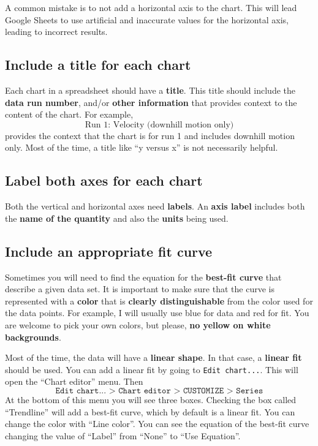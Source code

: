 A common mistake is to not add a horizontal axis to the chart. This will lead Google Sheets to use artificial and inaccurate values for the horizontal axis, leading to incorrect results.
%
\subsection{Include a title for each chart}
%
Each chart in a spreadsheet should have a \textbf{title}. This title should include the \textbf{data run number}, and/or \textbf{other information} that provides context to the content of the chart. For example,
\begin{equation}
    \text{Run 1: Velocity (downhill motion only)}
\end{equation}
provides the context that the chart is for run 1 and includes downhill motion only. Most of the time, a title like ``y versus x'' is not necessarily helpful.
%
\subsection{Label both axes for each chart}
%
Both the vertical and horizontal axes need \textbf{labels}. An \textbf{axis label} includes both the \textbf{name of the quantity} and also the \textbf{units} being used.
%
\subsection{Include an appropriate fit curve}
%
Sometimes you will need to find the equation for the \textbf{best-fit curve} that describe a given data set. It is important to make sure that the curve is represented with a \textbf{color} that is \textbf{clearly distinguishable} from the color used for the data points. For example, I will usually use blue for data and red for fit. You are welcome to pick your own colors, but please, \textbf{no yellow on white backgrounds}.

Most of the time, the data will have a \textbf{linear shape}. In that case, a \textbf{linear fit} should be used. You can add a linear fit by going to \texttt{Edit chart...}. This will open the ``Chart editor'' menu. Then
\begin{equation}
    \texttt{Edit chart... > Chart editor > CUSTOMIZE > Series}
\end{equation}
At the bottom of this menu you will see three boxes. Checking the box called ``Trendline'' will add a best-fit curve, which by default is a linear fit. You can change the color with ``Line color''. You can see the equation of the best-fit curve changing the value of ``Label'' from ``None'' to ``Use Equation''.

